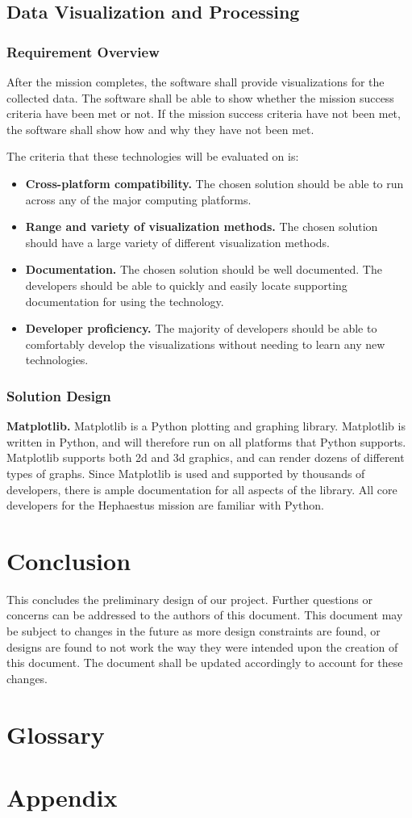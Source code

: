 \documentclass[letterpaper,10pt]{article}
\begin{document}
\subsection{Data Visualization and Processing}
\subsubsection{Requirement Overview}
After the mission completes, the software shall provide visualizations for the collected data.
The software shall be able to show whether the mission success criteria have been met or not.
If the mission success criteria have not been met, the software shall show how and
why they have not been met.

The criteria that these technologies will be evaluated on is:
\begin{itemize}
\item \textbf{Cross-platform compatibility.}
The chosen solution should be able to run across any of the major computing platforms.

\item \textbf{Range and variety of visualization methods.}
The chosen solution should have a large variety of different visualization methods.

\item \textbf{Documentation.}
The chosen solution should be well documented.
The developers should be able to quickly and easily locate supporting documentation for using the technology.

\item \textbf{Developer proficiency.}
The majority of developers should be able to comfortably develop the visualizations
without needing to learn any new technologies.
\end{itemize}
\subsubsection{Solution Design}
\textbf{Matplotlib.}
Matplotlib is a Python plotting and graphing library.
Matplotlib is written in Python, and will therefore run on all platforms that Python supports.
Matplotlib supports both 2d and 3d graphics, and can render dozens of different
types of graphs.
Since Matplotlib is used and supported by thousands of developers, there is ample
documentation for all aspects of the library.
All core developers for the Hephaestus mission are familiar with Python.

\section{Conclusion}
This concludes the preliminary design of our project. Further questions or concerns can be addressed to the authors of this document.
This document may be subject to changes in the future as more design constraints are found, or designs are found to not work the way
they were intended upon the creation of this document. The document shall be updated accordingly to account for these changes.
\section{Glossary}
\glsaddall
\printglossaries

\section{Appendix}

\end{document}
